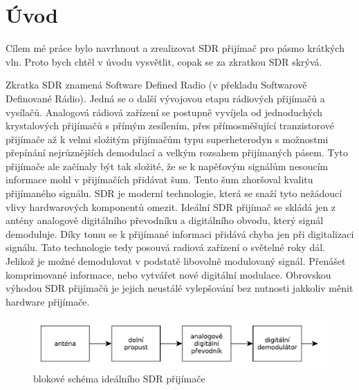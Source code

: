 \section*{Úvod}
\indent\indent Cílem mé práce bylo navrhnout a zrealizovat SDR přijímač pro pásmo krátkých vln. Proto bych chtěl v úvodu vysvětlit, copak se za zkratkou SDR skrývá.

Zkratka SDR znamená Software Defined Radio (v překladu Softwarově Definované Rádio). Jedná se o další vývojovou etapu rádiových přijímačů a vysílačů. Analogová rádiová zařízení se postupně vyvíjela od jednoduchých krystalových přijímačů s přímým zesílením, přes přímosměšující tranzistorové přijímače až k velmi složitým přijímačům typu superheterodyn s možnostmi přepínání nejrůznějších demodulací a velkým rozsahem přijímaných pásem. Tyto přijímače ale začínaly být tak složité, že se k napěťovým signálům nesoucím informace mohl v přijímačích přidávat šum. Tento šum zhoršoval  kvalitu přijímaného signálu. SDR je moderní technologie, která se snaží tyto nežádoucí vlivy hardwarových komponentů omezit. Ideální SDR přijímač se skládá jen z antény analogově digitálního převodníku a digitálního obvodu, který signál demoduluje. Díky tomu se k přijímané informaci přidává chyba jen při digitalizaci signálu. Tato technologie tedy posouvá radiová zařízení o světelné roky dál. Jelikož je možné demodulovat v podstatě libovolně modulovaný signál. Přenášet komprimované informace, nebo vytvářet nové digitální modulace. Obrovskou výhodou SDR přijímačů je jejich neustálé vylepšování bez nutnosti jakkoliv měnit hardware přijímače.
\begin{figure}[H]
	\centering
	\includegraphics[width=170mm]{img/i_sdr.pdf}
	\caption{blokové schéma ideálního SDR přijímače}    		
\end{figure}

\clearpage
		
	
  		
  		